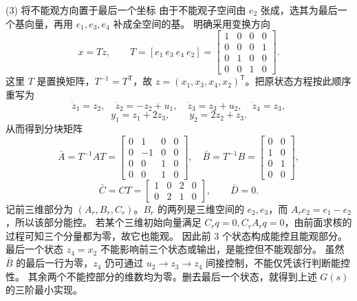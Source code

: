\documentclass[11pt]{article}
\begin{document}
\begin{solution}
\begin{proofstep}{(3) 将不能观方向置于最后一个坐标}
由于不能观子空间由 $e_2$ 张成，选其为最后一个基向量，再用 $e_1,e_3,e_4$ 补成全空间的基。
明确采用变换方向
\[
x=Tz,\qquad T=[e_1\ e_3\ e_4\ e_2]
=\begin{bmatrix}1&0&0&0\\0&0&0&1\\0&1&0&0\\0&0&1&0\end{bmatrix}.
\]
这里 $T$ 是置换矩阵，$T^{-1}=T^{\mathsf T}$，故
$z=(x_1,x_3,x_4,x_2)^{\mathsf T}$。把原状态方程按此顺序重写为
\[
\dot z_1=z_2,\quad \dot z_2=-z_2+u_1,\quad
\dot z_3=z_3+u_2,\quad \dot z_4=z_3,
\]
\[
y_1=z_1+2z_3,\qquad y_2=2z_2+z_3.
\]
从而得到分块矩阵
\[
\bar A=T^{-1}AT=\left[\begin{array}{ccc|c}0&1&0&0\\0&-1&0&0\\0&0&1&0\\\hline 0&0&1&0\end{array}\right],\quad
\bar B=T^{-1}B=\left[\begin{array}{cc}0&0\\1&0\\0&1\\\hline0&0\end{array}\right],
\]
\[
\bar C=CT=\left[\begin{array}{ccc|c}1&0&2&0\\0&2&1&0\end{array}\right],\qquad \bar D=0.
\]
记前三维部分为 $(A_r,B_r,C_r)$。$B_r$ 的两列是三维空间的 $e_2,e_3$，而
$A_re_2=e_1-e_2$，所以该部分能控。
若某个三维初始向量满足 $C_rq=0,C_rA_rq=0$，由前面求核的过程可知三个分量都为零，故它也能观。
因此前 3 个状态构成能控且能观部分。
最后一个状态 $z_4=x_2$ 不能影响前三个状态或输出，是能控但不能观部分。
虽然 $\bar B$ 的最后一行为零，$z_4$ 仍可通过 $u_2\to z_3\to z_4$ 间接控制，不能仅凭该行判断能控性。
其余两个不能控部分的维数均为零。删去最后一个状态，就得到上述 $G(s)$ 的三阶最小实现。
\end{proofstep}
\end{solution}
\end{document}
